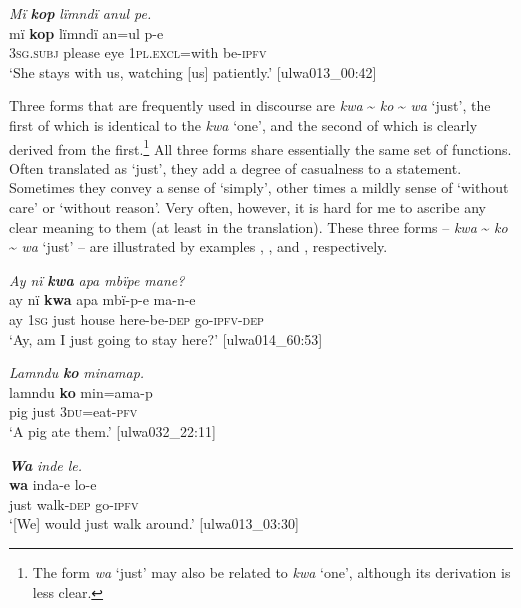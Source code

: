 \ea%
    \label{ex:otherwc:130}
          \textit{Mï} \textbf{\textit{kop}} \textit{lïmndï anul pe.}\\
\gll    mï      \textbf{kop}  lïmndï  an=ul        p-e\\
    3\textsc{sg.subj}  please  eye    1\textsc{pl.excl}=with  be\textsc{{}-ipfv}\\
\glt `She stays with us, watching [us] patiently.’ [ulwa013\_00:42]
\z

Three forms that are frequently used in discourse are \textit{kwa} {\textasciitilde} \textit{ko} {\textasciitilde} \textit{wa} ‘just’, the first of which is identical to the  \textit{kwa} ‘one’, and the second of which is clearly derived from the first.\footnote{The form \textit{wa} ‘just’ may also be related to \textit{kwa} ‘one’, although its derivation is less clear.} All three forms share essentially the same set of functions. Often translated as ‘just’, they add a degree of casualness to a statement. Sometimes they convey a sense of ‘simply’, other times a mildly  sense of ‘without care’ or ‘without reason’. Very often, however, it is hard for me to ascribe any clear meaning to them (at least in the  translation). These three forms -- \textit{kwa} {\textasciitilde} \textit{ko} {\textasciitilde} \textit{wa} ‘just’ -- are illustrated by examples , , and , respectively.

\ea%
    \label{ex:otherwc:131}
          \textit{Ay nï} \textbf{\textit{kwa}} \textit{apa mbïpe mane?}\\
\gll    ay  nï    \textbf{kwa}  apa    mbï-p-e    ma-n-e\\
    ay  1\textsc{sg}  just    house  here-be-\textsc{dep}  go-\textsc{ipfv-dep}\\
\glt `Ay, am I just going to stay here?’ [ulwa014\_60:53]
\z

\ea%
    \label{ex:otherwc:132}
          \textit{Lamndu} \textbf{\textit{ko}} \textit{minamap.}\\
\gll    lamndu  \textbf{ko}  min=ama-p\\
    pig      just  3\textsc{du}=eat-\textsc{pfv}\\
\glt `A pig ate them.’ [ulwa032\_22:11]
\z

\ea%
    \label{ex:otherwc:133}
          \textbf{\textit{Wa}} \textit{inde le.}\\
\gll    \textbf{wa}  inda-e    lo-e\\
    just  walk-\textsc{dep}  go-\textsc{ipfv}\\
\glt `[We] would just walk around.’ [ulwa013\_03:30]
\z

